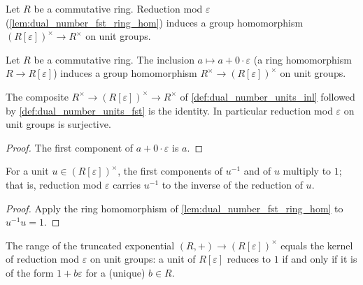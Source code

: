 \begin{definition}\leanok
  \label{def:dual_number_units_fst}
  Let \(R\) be a commutative ring. Reduction mod \(\varepsilon\)
  (\cref{lem:dual_number_fst_ring_hom}) induces a group homomorphism
  \((R[\varepsilon])^{\times} \to R^{\times}\) on unit groups.
\end{definition}

\begin{definition}\leanok
  \label{def:dual_number_units_inl}
  Let \(R\) be a commutative ring. The inclusion
  \(a \mapsto a + 0 \cdot \varepsilon\) (a ring homomorphism
  \(R \to R[\varepsilon]\)) induces a group homomorphism
  \(R^{\times} \to (R[\varepsilon])^{\times}\) on unit groups.
\end{definition}

\begin{lemma}\leanok
  \label{lem:dual_number_units_fst_split}
  The composite
  \(R^{\times} \to (R[\varepsilon])^{\times} \to R^{\times}\)
  of \cref{def:dual_number_units_inl} followed by
  \cref{def:dual_number_units_fst} is the identity. In particular
  reduction mod \(\varepsilon\) on unit groups is surjective.
\end{lemma}

\begin{proof}\leanok
  The first component of \(a + 0\cdot\varepsilon\) is \(a\).
\end{proof}

\begin{lemma}\leanok
  \label{lem:dual_number_fst_unit_inv}
  For a unit \(u \in (R[\varepsilon])^{\times}\), the first components
  of \(u^{-1}\) and of \(u\) multiply to \(1\); that is, reduction mod
  \(\varepsilon\) carries \(u^{-1}\) to the inverse of the reduction of
  \(u\).
\end{lemma}

\begin{proof}\leanok
  Apply the ring homomorphism of
  \cref{lem:dual_number_fst_ring_hom} to \(u^{-1} u = 1\).
\end{proof}

\begin{lemma}\leanok
  \label{lem:dual_number_trunc_exp_exact}
  The range of the truncated exponential
  \((R,+) \to (R[\varepsilon])^{\times}\) equals the kernel of
  reduction mod \(\varepsilon\) on unit groups: a unit of
  \(R[\varepsilon]\) reduces to \(1\) if and only if it is of the form
  \(1 + b\varepsilon\) for a (unique) \(b \in R\).
\end{lemma}

